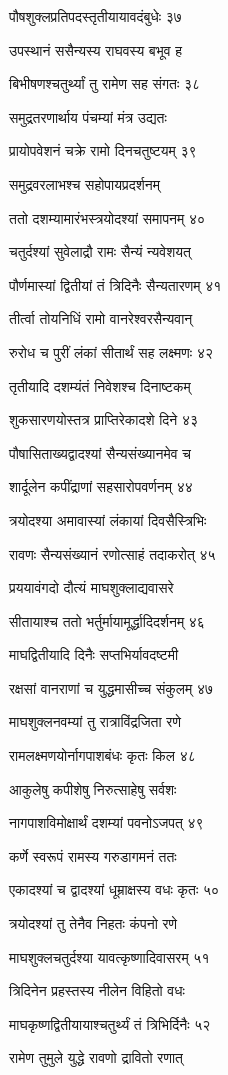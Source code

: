 पौषशुक्लप्रतिपदस्तृतीयायावदंबुधेः ३७

उपस्थानं ससैन्यस्य राघवस्य बभूव ह

बिभीषणश्चतुर्थ्यां तु रामेण सह संगतः ३८

समुद्रतरणार्थाय पंचम्यां मंत्र उद्यतः

प्रायोपवेशनं चक्रे रामो दिनचतुष्टयम् ३९

समुद्रवरलाभश्च सहोपायप्रदर्शनम्

ततो दशम्यामारंभस्त्रयोदश्यां समापनम् ४०

चतुर्दश्यां सुवेलाद्रौ रामः सैन्यं न्यवेशयत्

पौर्णमास्यां द्वितीयां तं त्रिदिनैः सैन्यतारणम् ४१

तीर्त्वा तोयनिधिं रामो वानरेश्वरसैन्यवान्

रुरोध च पुरीं लंकां सीतार्थं सह लक्ष्मणः ४२

तृतीयादि दशम्यंतं निवेशश्च दिनाष्टकम्

शुकसारणयोस्तत्र प्राप्तिरेकादशे दिने ४३

पौषासिताख्यद्वादश्यां सैन्यसंख्यानमेव च

शार्दूलेन कपींद्राणां सहसारोपवर्णनम् ४४

त्रयोदश्या अमावास्यां लंकायां दिवसैस्त्रिभिः

रावणः सैन्यसंख्यानं रणोत्साहं तदाकरोत् ४५

प्रययावंगदो दौत्यं माघशुक्लाद्यवासरे

सीतायाश्च ततो भर्तुर्मायामूर्द्धादिदर्शनम् ४६

माघद्वितीयादि दिनैः सप्तभिर्यावदष्टमी

रक्षसां वानराणां च युद्धमासीच्च संकुलम् ४७

माघशुक्लनवम्यां तु रात्राविंद्रजिता रणे

रामलक्ष्मणयोर्नागपाशबंधः कृतः किल ४८

आकुलेषु कपीशेषु निरुत्साहेषु सर्वशः

नागपाशविमोक्षार्थं दशम्यां पवनोऽजपत् ४९

कर्णे स्वरूपं रामस्य गरुडागमनं ततः

एकादश्यां च द्वादश्यां धूम्राक्षस्य वधः कृतः ५०

त्रयोदश्यां तु तेनैव निहतः कंपनो रणे

माघशुक्लचतुर्दश्या यावत्कृष्णादिवासरम् ५१

त्रिदिनेन प्रहस्तस्य नीलेन विहितो वधः

माघकृष्णद्वितीयायाश्चतुर्थ्यं तं त्रिभिर्दिनैः ५२

रामेण तुमुले युद्धे रावणो द्रावितो रणात्

